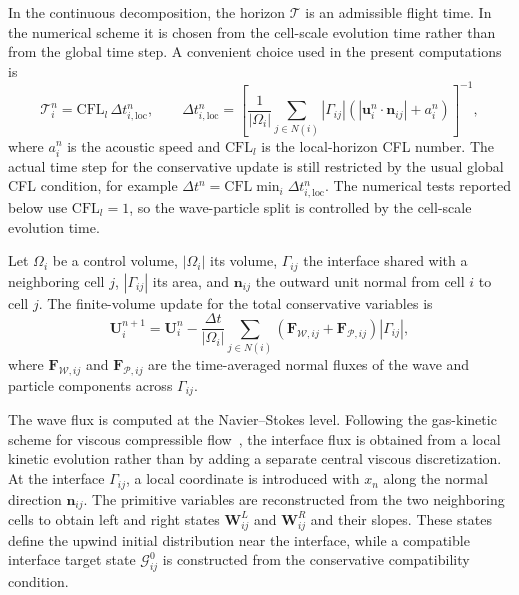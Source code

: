 \documentclass[preprint,12pt]{elsarticle}
\begin{document}
In the continuous decomposition, the horizon $\mathcal{T}$ is an admissible flight time. In the numerical scheme it is chosen from the cell-scale evolution time rather than from the global time step. A convenient choice used in the present computations is
\begin{equation}\label{eq:algorithm_local_horizon}
   \mathcal{T}_i^n=\mathrm{CFL}_l\,\Delta t_{i,\mathrm{loc}}^n,
    \qquad
    \Delta t_{i,\mathrm{loc}}^n
    =
    \left[
    \frac{1}{|\Omega_i|}
    \sum_{j\in N(i)}
    |\Gamma_{ij}|\left(
    |\boldsymbol{u}_i^n\cdot\boldsymbol{n}_{ij}|+a_i^n
    \right)
    \right]^{-1},
\end{equation}
where $a_i^n$ is the acoustic speed and $\mathrm{CFL}_l$ is the local-horizon CFL number. The actual time step for the conservative update is still restricted by the usual global CFL condition, for example $\Delta t^n=\mathrm{CFL}\min_i\Delta t_{i,\mathrm{loc}}^n$. The numerical tests reported below use $\mathrm{CFL}_l=1$, so the wave-particle split is controlled by the cell-scale evolution time.

Let $\Omega_i$ be a control volume, $|\Omega_i|$ its volume, $\Gamma_{ij}$ the interface shared with a neighboring cell $j$, $|\Gamma_{ij}|$ its area, and $\boldsymbol{n}_{ij}$ the outward unit normal from cell $i$ to cell $j$. The finite-volume update for the total conservative variables is
\begin{equation}\label{eq:fv_update_total}
    \mathbf U_i^{n+1}
    =
    \mathbf U_i^n
    -
    \frac{\Delta t}{|\Omega_i|}
    \sum_{j\in N(i)}
    \left(
    \mathbf F_{\mathcal{W},ij}
    +
    \mathbf F_{\mathcal{P},ij}
    \right)|\Gamma_{ij}|,
\end{equation}
where $\mathbf F_{\mathcal{W},ij}$ and $\mathbf F_{\mathcal{P},ij}$ are the time-averaged normal fluxes of the wave and particle components across $\Gamma_{ij}$.

The wave flux is computed at the Navier--Stokes level. Following the gas-kinetic scheme for viscous compressible flow~\cite{xu2001gks}, the interface flux is obtained from a local kinetic evolution rather than by adding a separate central viscous discretization. At the interface $\Gamma_{ij}$, a local coordinate is introduced with $x_n$ along the normal direction $\boldsymbol{n}_{ij}$. The primitive variables are reconstructed from the two neighboring cells to obtain left and right states $\mathbf W_{ij}^{L}$ and $\mathbf W_{ij}^{R}$ and their slopes. These states define the upwind initial distribution near the interface, while a compatible interface target state $\mathcal{G}_{ij}^{0}$ is constructed from the conservative compatibility condition.
\end{document}
